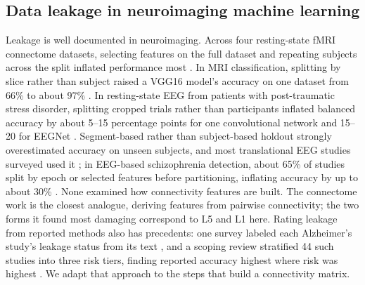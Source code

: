 \subsection{Data leakage in neuroimaging machine learning}
Leakage is well documented in neuroimaging. Across four resting-state fMRI connectome datasets, selecting features on the full dataset and repeating subjects across the split inflated performance most \cite{rosenblatt2024}. In MRI classification, splitting by slice rather than subject raised a VGG16 model's accuracy on one dataset from 66\% to about 97\% \cite{yagis2021}. In resting-state EEG from patients with post-traumatic stress disorder, splitting cropped trials rather than participants inflated balanced accuracy by about 5--15 percentage points for one convolutional network and 15--20 for EEGNet \cite{lee2023}. Segment-based rather than subject-based holdout strongly overestimated accuracy on unseen subjects, and most translational EEG studies surveyed used it \cite{brookshire2024}; in EEG-based schizophrenia detection, about 65\% of studies split by epoch or selected features before partitioning, inflating accuracy by up to about 30\% \cite{racz2026}. None examined how connectivity features are built. The connectome work is the closest analogue, deriving features from pairwise connectivity; the two forms it found most damaging correspond to L5 and L1 here. Rating leakage from reported methods also has precedents: one survey labeled each Alzheimer's study's leakage status from its text \cite{wen2020}, and a scoping review stratified 44 such studies into three risk tiers, finding reported accuracy highest where risk was highest \cite{young2025}. We adapt that approach to the steps that build a connectivity matrix.
